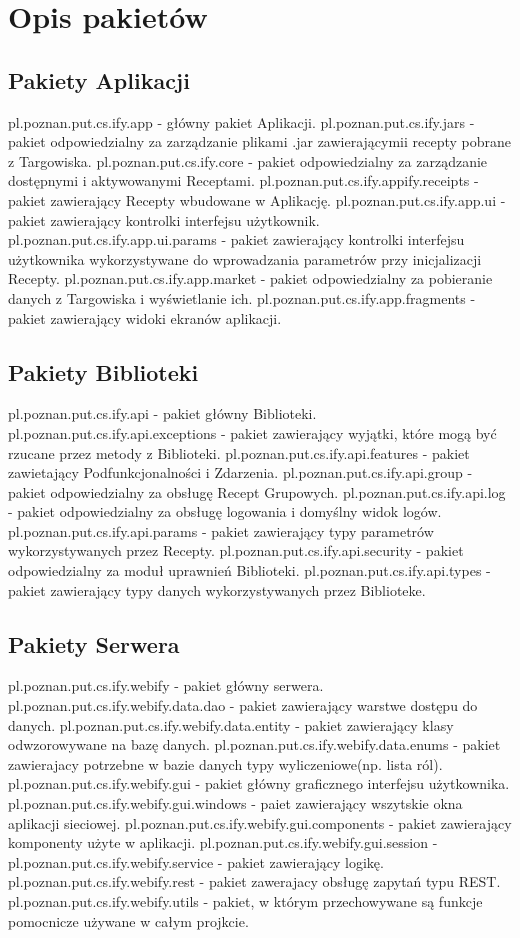\documentclass[11pt,a4paper,polish,thesis]{dcsbook}
\begin{document}
\section{Opis pakietów}
\subsection{Pakiety Aplikacji}
pl.poznan.put.cs.ify.app - główny pakiet Aplikacji.
pl.poznan.put.cs.ify.jars - pakiet odpowiedzialny za zarządzanie plikami .jar zawierającymii recepty pobrane z Targowiska.
pl.poznan.put.cs.ify.core - pakiet odpowiedzialny za zarządzanie dostępnymi i aktywowanymi Receptami.
pl.poznan.put.cs.ify.appify.receipts - pakiet zawierający Recepty wbudowane w Aplikację.
pl.poznan.put.cs.ify.app.ui - pakiet zawierający kontrolki interfejsu użytkownik.
pl.poznan.put.cs.ify.app.ui.params - pakiet zawierający kontrolki interfejsu użytkownika wykorzystywane do wprowadzania parametrów przy inicjalizacji Recepty.
pl.poznan.put.cs.ify.app.market - pakiet odpowiedzialny za pobieranie danych z Targowiska i wyświetlanie ich.
pl.poznan.put.cs.ify.app.fragments - pakiet zawierający widoki ekranów aplikacji.
\subsection{Pakiety Biblioteki}
pl.poznan.put.cs.ify.api - pakiet główny Biblioteki.
pl.poznan.put.cs.ify.api.exceptions - pakiet zawierający wyjątki, które mogą być rzucane przez metody z Biblioteki.
pl.poznan.put.cs.ify.api.features - pakiet zawietający Podfunkcjonalności i Zdarzenia.
pl.poznan.put.cs.ify.api.group - pakiet odpowiedzialny za obsługę Recept Grupowych.
pl.poznan.put.cs.ify.api.log - pakiet odpowiedzialny za obsługę logowania i domyślny widok logów.
pl.poznan.put.cs.ify.api.params - pakiet zawierający typy parametrów wykorzystywanych przez Recepty.
pl.poznan.put.cs.ify.api.security - pakiet odpowiedzialny za moduł uprawnień Biblioteki.
pl.poznan.put.cs.ify.api.types - pakiet zawierający typy danych wykorzystywanych przez Biblioteke.
\subsection{Pakiety Serwera}
pl.poznan.put.cs.ify.webify - pakiet główny serwera.
pl.poznan.put.cs.ify.webify.data.dao - pakiet zawierający warstwe dostępu do danych.
pl.poznan.put.cs.ify.webify.data.entity - pakiet zawierający klasy odwzorowywane na bazę danych.
pl.poznan.put.cs.ify.webify.data.enums - pakiet zawierajacy potrzebne w bazie danych typy wyliczeniowe(np. lista ról). 
pl.poznan.put.cs.ify.webify.gui - pakiet główny graficznego interfejsu użytkownika.
pl.poznan.put.cs.ify.webify.gui.windows - paiet zawierający wszytskie okna aplikacji sieciowej.
pl.poznan.put.cs.ify.webify.gui.components - pakiet zawierający komponenty użyte w aplikacji.
pl.poznan.put.cs.ify.webify.gui.session - 
pl.poznan.put.cs.ify.webify.service - pakiet zawierający logikę.
pl.poznan.put.cs.ify.webify.rest - pakiet zawerajacy obsługę zapytań typu REST.
pl.poznan.put.cs.ify.webify.utils - pakiet, w którym przechowywane są funkcje pomocnicze używane w całym projkcie.
\end{document}
